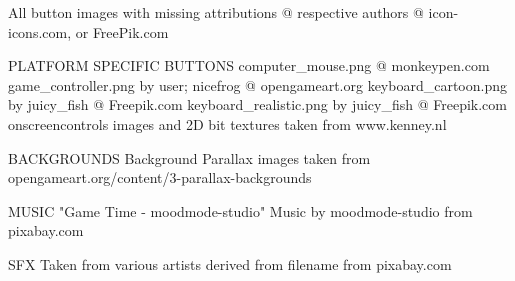 \begin{DoxyVerb}
              All button images with missing attributions @ respective
                    authors @ icon-icons.com, or FreePik.com


                        PLATFORM SPECIFIC BUTTONS
                computer_mouse.png @ monkeypen.com
                game_controller.png by user; nicefrog @ opengameart.org
                keyboard_cartoon.png by juicy_fish @ Freepik.com
                keyboard_realistic.png by juicy_fish @ Freepik.com
                onscreencontrols images and 2D bit textures taken from www.kenney.nl

                              BACKGROUNDS
      Background Parallax images taken from opengameart.org/content/3-parallax-backgrounds

                                  MUSIC
      "Game Time - moodmode-studio" Music by moodmode-studio from pixabay.com

                                  SFX
      Taken from various artists derived from filename from pixabay.com
\end{DoxyVerb}
 